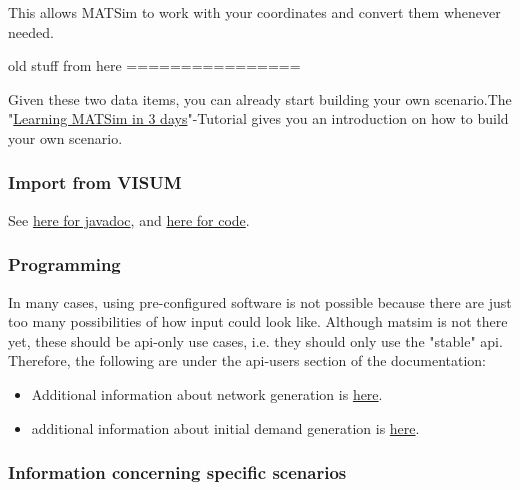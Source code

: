 This allows MATSim to work with your coordinates and convert them whenever
needed.


old stuff from here
================

Given these two data items, you can already start building your own
scenario.The "\href{http://www.matsim.org/docs/tutorials/learningIn3days}{Learning MATSim in 3 days}"-Tutorial gives you an introduction on how to build your own scenario.

\subsubsection{Import from VISUM}

See \href{http://matsim.org/javadoc/org/matsim/visum/package-summary.html}{here for javadoc}, and \href{http://matsim.org/xref/org/matsim/visum/package-summary.html}{here for code}.

\subsubsection{Programming}

In many cases, using pre-configured software is not possible because  there are just too many possibilities of how input could look like.  Although matsim is not there yet, these should be api-only use cases,  i.e. they should only use the "stable" api. Therefore, the  following are under the api-users section of the documentation:
\begin{itemize}
	\item Additional information about network generation is \href{http://matsim.org/node/588}{here}.
	\item additional information about initial demand generation is \href{http://matsim.org/node/340}{here}.
\end{itemize}

\subsubsection{Information concerning specific scenarios}



